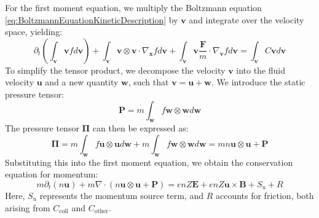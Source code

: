 For the first moment equation, we multiply the Boltzmann equation \ref{eq:BoltzmannEquationKineticDescription} by $\mathbf{v}$ and integrate over the velocity space, yielding:
\begin{equation}
	\partial_t \left( \int_\mathbf{v} \mathbf{v} f d\mathbf{v} \right) + \int_\mathbf{v} \mathbf{v} \otimes \mathbf{v} \cdot \nabla_{\mathbf{x}} f d\mathbf{v} + \int_\mathbf{v} \mathbf{v} \frac{\mathbf{F}}{m} \cdot \nabla_{\mathbf{v}} f d\mathbf{v} = \int_\mathbf{v} C \mathbf{v} d\mathbf{v}
\end{equation}
To simplify the tensor product, we decompose the velocity $\mathbf{v}$ into the fluid velocity $\mathbf{u}$ and a new quantity $\mathbf{w}$, such that $\mathbf{v} = \mathbf{u} + \mathbf{w}$. We introduce the static pressure tensor:
\begin{equation}
	\boldsymbol{P} = m \int_\mathbf{w} f \mathbf{w} \otimes \mathbf{w} d\mathbf{w}
\end{equation}
The pressure tensor $\boldsymbol{\Pi}$ can then be expressed as:
\begin{equation}
	\boldsymbol{\Pi} = m \int_\mathbf{w} f \mathbf{u} \otimes \mathbf{u} d\mathbf{w} + m \int_\mathbf{w} f \mathbf{w} \otimes \mathbf{w} d\mathbf{w} = mn \mathbf{u} \otimes \mathbf{u} + \boldsymbol{P}
\end{equation}
Substituting this into the first moment equation, we obtain the conservation equation for momentum:
\begin{equation}
	\label{eq:FirstMomentTransportEquation}
	m \partial_t (n \mathbf{u}) + m \nabla \cdot \left( n \mathbf{u} \otimes \mathbf{u} + \boldsymbol{P} \right) = enZ \mathbf{E} + enZ \mathbf{u} \times \mathbf{B} + S_u + R
\end{equation}
Here, $S_u$ represents the momentum source term, and $R$ accounts for friction, both arising from $C_{\text{coll}}$ and $C_{\text{other}}$.

